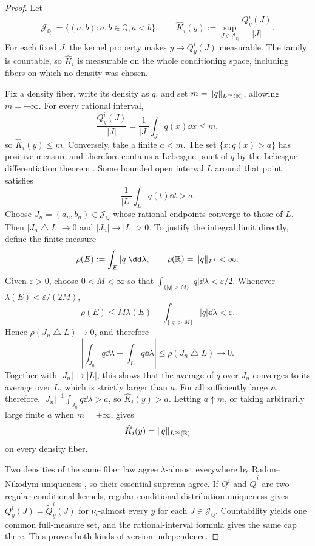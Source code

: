 \begin{proof}
Let
\[
\mathscr J_{\mathbb Q}:=\{(a,b):a,b\in\mathbb Q, a<b\},
\qquad
\widehat K_i(y):=\sup_{J\in\mathscr J_{\mathbb Q}}
\frac{Q^i_y(J)}{|J|}.
\]
For each fixed $J$, the kernel property makes $y\mapsto Q^i_y(J)$
measurable.  The family is countable, so $\widehat K_i$ is measurable on the
whole conditioning space, including fibers on which no density was chosen.

Fix a density fiber, write its density as $q$, and set
$m=\|q\|_{L^\infty(\mathbb{R})}$, allowing $m=+\infty$.  For every rational interval,
\[
\frac{Q^i_y(J)}{|J|}=\frac1{|J|}\int_Jq(x)\dd x\leq m,
\]
so $\widehat K_i(y)\leq m$.  Conversely, take a finite $a<m$.  The set
$\{x:q(x)>a\}$ has positive measure and therefore contains a Lebesgue point
of $q$ by the Lebesgue differentiation theorem
\cite[Theorem~3.21]{Folland1999}.  Some bounded open interval $L$ around that point satisfies
\[
\frac1{|L|}\int_Lq(t)\dd t>a.
\]
Choose $J_n=(a_n,b_n)\in\mathscr J_{\mathbb Q}$ whose rational endpoints
converge to those of $L$.  Then $|J_n\mathbin{\triangle}L|\to0$ and
$|J_n|\to|L|>0$.  To justify
the integral limit directly, define the finite measure
\[
\rho(E):=\int_E|q|\dd\lambda,
\qquad \rho(\R)=\|q\|_{L^1}<\infty.
\]
Given $\varepsilon>0$, choose $0<M<\infty$ so that
$\int_{\{|q|>M\}}|q|\dd\lambda<\varepsilon/2$.  Whenever
$\lambda(E)<\varepsilon/(2M)$,
\[
\rho(E)
\leq M\lambda(E)+\int_{\{|q|>M\}}|q|\dd\lambda
<\varepsilon.
\]
Hence $\rho(J_n\mathbin{\triangle}L)\to0$, and therefore
\[
\left|\int_{J_n}q\dd\lambda-\int_Lq\dd\lambda\right|
\leq\rho(J_n\mathbin{\triangle}L)\longrightarrow0.
\]
Together with $|J_n|\to|L|$, this shows that the average of $q$ over $J_n$
converges to its average over $L$, which is strictly larger than $a$.  For
all sufficiently large $n$, therefore,
$|J_n|^{-1}\int_{J_n}q\dd\lambda>a$, so $\widehat K_i(y)>a$.  Letting
$a\uparrow m$, or taking arbitrarily large finite $a$ when $m=+\infty$, gives
\begin{equation}
\widehat K_i(y)=\|q\|_{L^\infty(\mathbb{R})}
\label{eq:rational-cap-identity}
\end{equation}
on every density fiber.

Two densities of the same fiber law agree $\lambda$-almost everywhere by
Radon--Nikodym uniqueness \cite[Theorem~3.8]{Folland1999}, so
their essential suprema agree.  If $Q^i$ and $\widetilde Q^i$ are two regular
conditional kernels, regular-conditional-distribution uniqueness
\cite[Theorem~6.3]{Kallenberg2002} gives
$Q^i_y(J)=\widetilde Q^i_y(J)$ for $\nu_i$-almost every $y$ for each
$J\in\mathscr J_{\mathbb Q}$.  Countability yields one common full-measure
set, and the rational-interval formula gives the same cap there.  This proves
both kinds of version independence.


\end{proof}
